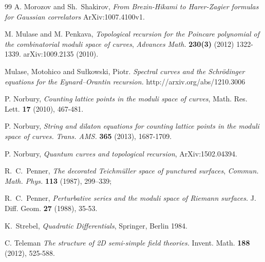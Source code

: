\documentclass[11pt]{article}
\theoremstyle{plain}
\theoremstyle{definition}
\begin{document}
\begin{thebibliography}{99}
 A. Morozov and Sh.~Shakirov,
{\it From Brezin-Hikami to Harer-Zagier formulas for Gaussian correlators} ArXiv:1007.4100v1.

 M. Mulase and M. Penkava, {\it Topological recursion for the Poincare polynomial of the combinatorial moduli space of curves},  {\sl Advances Math.} {\bf 230(3)} (2012) 1322-1339.
arXiv:1009.2135 (2010).

Mulase, Motohico and Su{\l}kowski, Piotr.
\emph{Spectral curves and the Schr\"{o}dinger equations for the Eynard--Orantin recursion.}
http://arxiv.org/abs/1210.3006

 P. Norbury, {\it Counting lattice points in the moduli space of curves},  Math. Res. Lett. {\bf 17} (2010), 467-481.

P. Norbury, 
\emph{String and dilaton equations for counting lattice points in the moduli space of curves.}
{\em Trans.  AMS.} {\bf 365} (2013), 1687-1709. 

P. Norbury, \emph{Quantum curves and topological recursion}, ArXiv:1502.04394.


R.~C.~Penner, {\it The decorated Teichm\"uller space of punctured surfaces},
{\sl Commun. Math. Phys.} {\bf 113} (1987), 299--339;

  R.~C.~Penner,
\emph{Perturbative series and the moduli space of Riemann surfaces.} J. Diff. Geom. {\bf 27} (1988), 35-53.


K.~Strebel, {\sl Quadratic Differentials}, Springer, Berlin 1984.


 C. Teleman
\emph{The structure of 2D semi-simple field theories.} 
Invent. Math. {\bf 188} (2012), 525-588.



\end{thebibliography}
\end{document}

